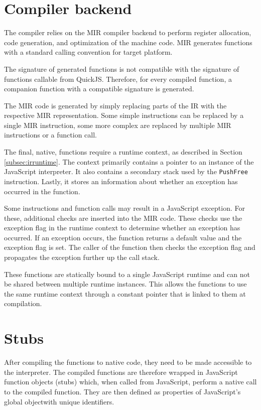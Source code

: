 \section{Compiler backend}

The compiler relies on the MIR compiler backend to perform register allocation, code generation, and optimization of the machine code. MIR generates functions with a standard calling convention for target platform.

The signature of generated functions is not compatible with the signature of functions callable from QuickJS. Therefore, for every compiled function, a companion function with a compatible signature is generated.

The MIR code is generated by simply replacing parts of the IR with the respective MIR representation. Some simple instructions can be replaced by a single MIR instruction, some more complex are replaced by multiple MIR instructions or a function call.

The final, native, functions require a runtime context, as described in Section \ref{subsec:irruntime}. The context primarily contains a pointer to an instance of the JavaScript interpreter. It also contains a secondary stack used by the \texttt{PushFree} instruction. Lastly, it stores an information about whether an exception has occurred in the function.

Some instructions and function calls may result in a JavaScript exception. For these, additional checks are inserted into the MIR code. These checks use the exception flag in the runtime context to determine whether an exception has occurred. If an exception occurs, the function returns a default value and the exception flag is set. The caller of the function then checks the exception flag and propagates the exception further up the call stack.

These functions are statically bound to a single JavaScript runtime and can not be shared between multiple runtime instances. This allows the functions to use the same runtime context through a constant pointer that is linked to them at compilation.


\section{Stubs}\label{impl:stubs}

After compiling the functions to native code, they need to be made accessible to the interpreter. The compiled functions are therefore wrapped in JavaScript function objects (stubs) which, when called from JavaScript, perform a native call to the compiled function. They are then defined as properties of JavaScript's global object\footnotemark[1] with unique identifiers.

